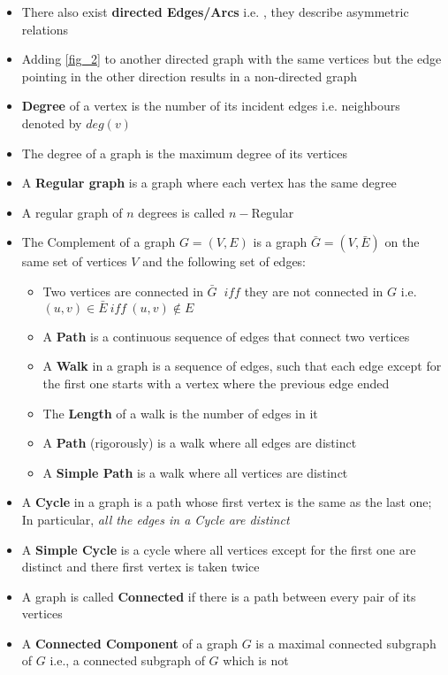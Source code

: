 \begin{itemize}
\item There also exist \textbf{directed Edges/Arcs} i.e. , they describe asymmetric relations
\item Adding \ref{fig_2} to another directed graph with the same vertices but the edge pointing in the other direction results in a non-directed graph
\item \textbf{Degree} of a vertex is the number of its incident edges i.e. neighbours denoted by $deg(v)$
\item The degree of a graph is the maximum degree of its vertices
\item A \textbf{Regular graph} is a graph where each vertex has the same degree
\item A regular graph of $n$ degrees is called $n-$Regular
\item  The Complement of a graph $G = (V, E)$ is a graph $\bar{G} = (V, \bar{E})$ on the same set of vertices $V$ and the following set of edges:
\begin{itemize}
\item Two vertices are connected in $\bar{G}$ $\ iff$ they are not connected in $G$ i.e. $(u,v) \in \bar{E} \ iff \  (u,v) \notin E$
\item A \textbf{Path} is a continuous sequence of edges that connect two vertices
\item A \textbf{Walk} in a graph is a sequence of edges, such that each edge except for the first one starts with a vertex where the previous edge ended
\item The \textbf{Length} of a walk is the number of edges in it
\item A \textbf{Path} (rigorously) is a walk where all edges are distinct
\item A \textbf{Simple Path} is a walk where all vertices are distinct
\end{itemize}
\item  A \textbf{Cycle} in a graph is a path whose first vertex is the same as the last one; In particular, \textit{all the edges in a Cycle are
	distinct}
\item A \textbf{Simple Cycle} is a cycle where all vertices
except for the first one are distinct and
there first vertex is taken twice
\item A graph is called \textbf{Connected} if there is a path
between every pair of its vertices
\item  A \textbf{Connected Component} of a graph $G$ is a
maximal connected subgraph of $G$ i.e., a connected subgraph of $G$ which is not

\end{itemize}
